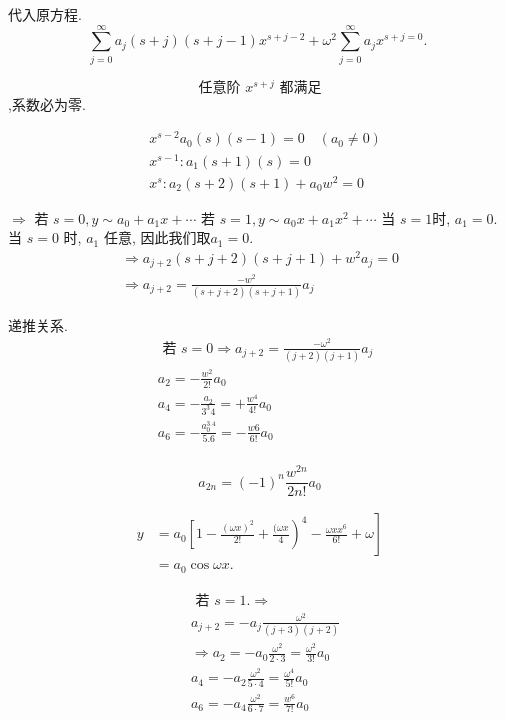 代入原方程.
$$
\sum_{j=0}^{\infty} a_j(s+j)(s+j-1) x^{s+j-2}+\omega^2 \sum_{j=0}^{\infty} a_j x^{s+j=0} \text {. }
$$

$$
\text { 任意阶 } x^{s+j} \text { 都满足 }
$$
,系数必为零.

$$
\begin{aligned}
& x^{s-2} a_0(s)(s-1)=0 \quad\left(a_0 \neq 0\right) \\
& x^{s-1}: a_1(s+1)(s)=0 \\
& x^s: a_2(s+2)(s+1)+a_0 w^2=0
\end{aligned}
$$

$\Rightarrow$ 若 $s=0, y \sim  a_0+a_1 x+\cdots$
若 $s=1, y \sim a_0 x+a_1 x^2+\cdots$
当 $s=1$时, $a_1=0$.
当 $s=0$ 时, $a_1$ 任意, 因此我们取$a_1=0$.
$$
\begin{gathered}
\Rightarrow a_{j+2}(s+j+2)(s+j+1)+w^2 a_j=0 \\
\Rightarrow a_{j+2}=\frac{-w^2}{(s+j+2)(s+j+1)} a_j
\end{gathered}
$$

递推关系.
$$
\begin{aligned}
& \text { 若 } s=0 \Rightarrow a_{j+2}=\frac{-\omega^2}{(j+2)(j+1)} a_j \\
& a_2=-\frac{w^2}{2 !} a_0 \\
& a_4=-\frac{a_2}{3^3 4}=+\frac{w^4}{4 !} a_0 \\
& a_6=-\frac{a_0^{3.4}}{5.6}=-\frac{w 6}{6 !} a_0 \\
&
\end{aligned}
$$

$$
a_{2 n}=(-1)^n \frac{w^{2 n}}{2 n !} a_0
$$

$$
\begin{aligned}
y & \left.=a_0\left[1-\frac{(\omega x)^2}{2 !}+\frac{(\omega x}{4}\right)^4-\frac{\omega x x^6}{6 !}+\omega\right] \\
& =a_0 \cos \omega x .
\end{aligned}
$$

$$
\begin{aligned}
& \text { 若 } s=1 . \Rightarrow \\
& a_{j+2}=-a_j \frac{\omega^2}{(j+3) (j+2)} \\
& \Rightarrow a_2=-a_0 \frac{\omega^2}{2 \cdot 3}=\frac{\omega^2}{3 !} a_0 \\
& a_4=-a_2 \frac{\omega^2}{5 \cdot 4}=\frac{\omega^4}{5 !} a_0 \\
& a_6=-a_4 \frac{\omega^2}{6\cdot 7}=\frac{w^6}{7 !} a_0 \\
\end{aligned}
$$


